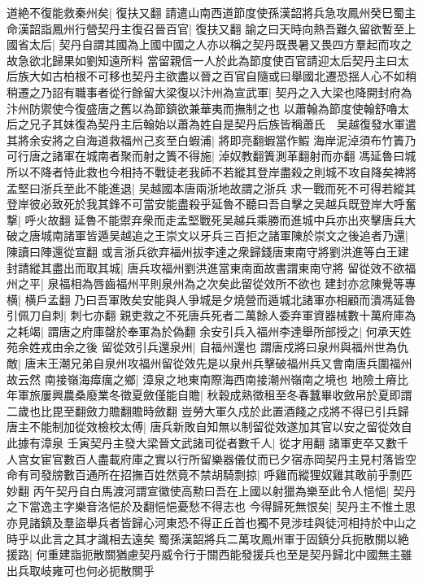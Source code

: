道絶不復能救秦州矣|{
	復扶又翻}
請遣山南西道節度使孫漢韶將兵急攻鳳州癸巳蜀主命漢韶詣鳳州行營契丹主復召晉百官|{
	復扶又翻}
諭之曰天時向熱吾難久留欲暫至上國省太后|{
	契丹自謂其國為上國中國之人亦以稱之契丹既畏暑又畏四方羣起而攻之故急欲北歸果如劉知遠所料}
當留親信一人於此為節度使百官請迎太后契丹主曰太后族大如古柏根不可移也契丹主欲盡以晉之百官自隨或曰舉國北遷恐揺人心不如稍稍遷之乃詔有職事者從行餘留大梁復以汴州為宣武軍|{
	契丹之入大梁也降開封府為汴州防禦使今復盛唐之舊以為節鎮欲兼華夷而撫制之也}
以蕭翰為節度使翰舒嚕太后之兄子其妹復為契丹主后翰始以蕭為姓自是契丹后族皆稱蕭氏　吴越復發水軍遣其將余安將之自海道救福州己亥至白蝦浦|{
	將即亮翻蝦當作鰕}
海岸泥淖須布竹簀乃可行唐之諸軍在城南者聚而射之簀不得施|{
	淖奴教翻簀測革翻射而亦翻}
馮延魯曰城所以不降者恃此救也今相持不戰徒老我師不若縱其登岸盡殺之則城不攻自降矣裨將孟堅曰浙兵至此不能進退|{
	吴越國本唐兩浙地故謂之浙兵}
求一戰而死不可得若縱其登岸彼必致死於我其鋒不可當安能盡殺乎延魯不聽曰吾自擊之吴越兵既登岸大呼奮撃|{
	呼火故翻}
延魯不能禦弃衆而走孟堅戰死吴越兵乘勝而進城中兵亦出夾擊唐兵大破之唐城南諸軍皆遁吴越追之王崇文以牙兵三百拒之諸軍陳於崇文之後追者乃還|{
	陳讀曰陣還從宣翻}
或言浙兵欲弃福州拔李達之衆歸錢唐東南守將劉洪進等白王建封請縱其盡出而取其城|{
	唐兵攻福州劉洪進當東南面故書謂東南守將}
留從效不欲福州之平|{
	泉福相為唇齒福州平則泉州為之次矣此留從效所不欲也}
建封亦忿陳覺等專横|{
	横戶孟翻}
乃曰吾軍敗矣安能與人爭城是夕燒營而遁城北諸軍亦相顧而潰馮延魯引佩刀自刺|{
	刺七亦翻}
親吏救之不死唐兵死者二萬餘人委弃軍資器械數十萬府庫為之耗竭|{
	謂唐之府庫罄於奉軍為於偽翻}
余安引兵入福州李達舉所部授之|{
	何承天姓苑余姓戎由余之後}
留從效引兵還泉州|{
	自福州還也}
謂唐戍將曰泉州與福州世為仇敵|{
	唐末王潮兄弟自泉州攻福州留從效先是以泉州兵擊破福州兵又會南唐兵圍福州故云然}
南接嶺海瘴癘之鄉|{
	漳泉之地東南際海西南接潮州嶺南之境也}
地險土瘠比年軍旅屢興農桑廢業冬徵夏斂僅能自贍|{
	秋穀成熟徵租至冬春蠶畢收斂帛於夏即謂二歲也比毘至翻斂力贍翻贍時斂翻}
豈勞大軍久戍於此置酒餞之戍將不得已引兵歸唐主不能制加從效檢校太傅|{
	唐兵新敗自知無以制留從效遂加其官以安之留從效自此據有漳泉}
壬寅契丹主發大梁晉文武諸司從者數千人|{
	從才用翻}
諸軍吏卒又數千人宫女宦官數百人盡載府庫之實以行所留樂器儀仗而已夕宿赤岡契丹主見村落皆空命有司發牓數百通所在招撫百姓然竟不禁胡騎剽掠|{
	呼雞而縱狸奴雞其敢前乎剽匹妙翻}
丙午契丹自白馬渡河謂宣徽使高勲曰吾在上國以射獵為樂至此令人悒悒|{
	契丹之下當逸主字樂音洛悒於及翻悒悒憂愁不得志也}
今得歸死無恨矣|{
	契丹主不惟土思亦見諸鎮及羣盜舉兵者皆歸心河東恐不得正丘首也獨不見涉珪與徒河相持於中山之時乎以此言之其才識相去遠矣}
蜀孫漢韶將兵二萬攻鳳州軍于固鎮分兵扼散關以絶援路|{
	何重建詣扼散關猶慮契丹威令行于關西能發援兵也至是契丹歸北中國無主雖出兵取岐雍可也何必扼散關乎}
